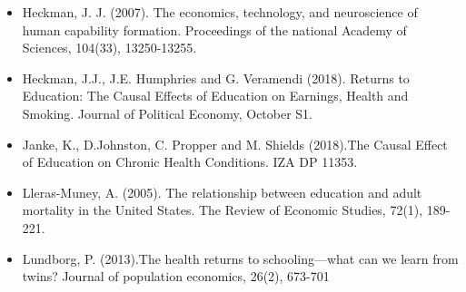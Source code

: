 \begin{itemize}
        \item Heckman, J. J. (2007). The economics, technology, and neuroscience of human capability formation. Proceedings of the national
        Academy of Sciences, 104(33), 13250-13255.
        \item Heckman, J.J., J.E. Humphries and G. Veramendi (2018). Returns to Education: The Causal Effects of Education on Earnings, Health
        and Smoking. Journal of Political Economy, October S1.
        \item Janke, K., D.Johnston, C. Propper and M. Shields (2018).The Causal Effect of Education on Chronic Health Conditions. IZA DP 11353.
        \item Lleras-Muney, A. (2005). The relationship between education and adult mortality in the United States. The Review of Economic
        Studies, 72(1), 189-221.
        \item Lundborg, P. (2013).The health returns to schooling—what can we learn from twins? Journal of population economics, 26(2), 673-701 
    \end{itemize}